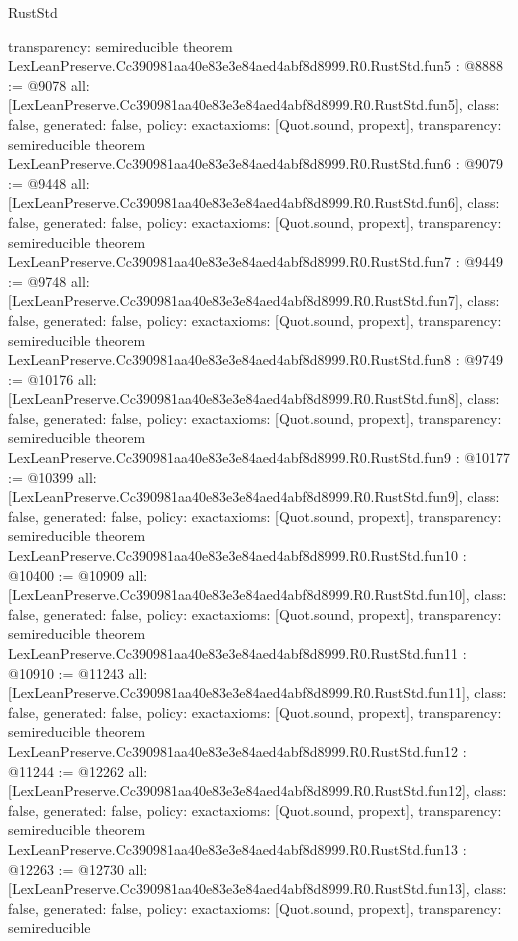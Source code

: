 \begin{lexlean}{RustStd}
\begin{coremodule}
{  transparency: semireducible
}
theorem LexLeanPreserve.Cc390981aa40e83e3e84aed4abf8d8999.R0.RustStd.fun5 : @8888 := @9078 {
  all: [LexLeanPreserve.Cc390981aa40e83e3e84aed4abf8d8999.R0.RustStd.fun5],
  class: false,
  generated: false,
  policy: exact{axioms: [Quot.sound, propext]},
  transparency: semireducible
}
theorem LexLeanPreserve.Cc390981aa40e83e3e84aed4abf8d8999.R0.RustStd.fun6 : @9079 := @9448 {
  all: [LexLeanPreserve.Cc390981aa40e83e3e84aed4abf8d8999.R0.RustStd.fun6],
  class: false,
  generated: false,
  policy: exact{axioms: [Quot.sound, propext]},
  transparency: semireducible
}
theorem LexLeanPreserve.Cc390981aa40e83e3e84aed4abf8d8999.R0.RustStd.fun7 : @9449 := @9748 {
  all: [LexLeanPreserve.Cc390981aa40e83e3e84aed4abf8d8999.R0.RustStd.fun7],
  class: false,
  generated: false,
  policy: exact{axioms: [Quot.sound, propext]},
  transparency: semireducible
}
theorem LexLeanPreserve.Cc390981aa40e83e3e84aed4abf8d8999.R0.RustStd.fun8 : @9749 := @10176 {
  all: [LexLeanPreserve.Cc390981aa40e83e3e84aed4abf8d8999.R0.RustStd.fun8],
  class: false,
  generated: false,
  policy: exact{axioms: [Quot.sound, propext]},
  transparency: semireducible
}
theorem LexLeanPreserve.Cc390981aa40e83e3e84aed4abf8d8999.R0.RustStd.fun9 : @10177 := @10399 {
  all: [LexLeanPreserve.Cc390981aa40e83e3e84aed4abf8d8999.R0.RustStd.fun9],
  class: false,
  generated: false,
  policy: exact{axioms: [Quot.sound, propext]},
  transparency: semireducible
}
theorem LexLeanPreserve.Cc390981aa40e83e3e84aed4abf8d8999.R0.RustStd.fun10 : @10400 := @10909 {
  all: [LexLeanPreserve.Cc390981aa40e83e3e84aed4abf8d8999.R0.RustStd.fun10],
  class: false,
  generated: false,
  policy: exact{axioms: [Quot.sound, propext]},
  transparency: semireducible
}
theorem LexLeanPreserve.Cc390981aa40e83e3e84aed4abf8d8999.R0.RustStd.fun11 : @10910 := @11243 {
  all: [LexLeanPreserve.Cc390981aa40e83e3e84aed4abf8d8999.R0.RustStd.fun11],
  class: false,
  generated: false,
  policy: exact{axioms: [Quot.sound, propext]},
  transparency: semireducible
}
theorem LexLeanPreserve.Cc390981aa40e83e3e84aed4abf8d8999.R0.RustStd.fun12 : @11244 := @12262 {
  all: [LexLeanPreserve.Cc390981aa40e83e3e84aed4abf8d8999.R0.RustStd.fun12],
  class: false,
  generated: false,
  policy: exact{axioms: [Quot.sound, propext]},
  transparency: semireducible
}
theorem LexLeanPreserve.Cc390981aa40e83e3e84aed4abf8d8999.R0.RustStd.fun13 : @12263 := @12730 {
  all: [LexLeanPreserve.Cc390981aa40e83e3e84aed4abf8d8999.R0.RustStd.fun13],
  class: false,
  generated: false,
  policy: exact{axioms: [Quot.sound, propext]},
  transparency: semireducible
}
\end{coremodule}
\end{lexlean}
